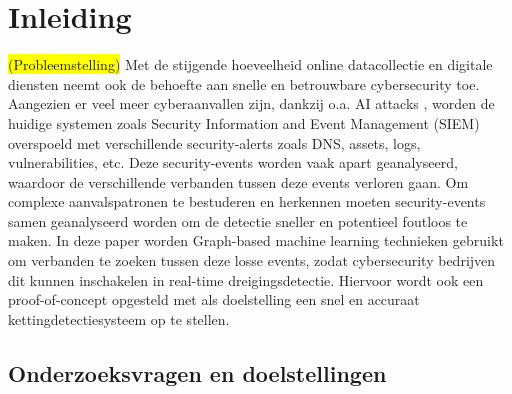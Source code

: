 


% 

\section{Inleiding}%
\label{sec:inleiding}
\colorbox{yellow}{(Probleemstelling)} Met de stijgende hoeveelheid online datacollectie en digitale diensten neemt ook de behoefte aan snelle en betrouwbare cybersecurity toe. Aangezien er veel meer cyberaanvallen zijn, dankzij o.a. AI attacks \autocite{Henderson2024}, worden de huidige systemen zoals Security Information and Event Management (SIEM) overspoeld met verschillende security-alerts zoals DNS, assets, logs, vulnerabilities, etc. 
Deze security-events worden vaak apart geanalyseerd, waardoor de verschillende verbanden tussen deze events verloren gaan. Om complexe aanvalspatronen te bestuderen en herkennen moeten security-events samen geanalyseerd worden om de detectie sneller en potentieel foutloos te maken. 
\newline
\newline
In deze paper worden Graph-based machine \newline learning technieken gebruikt om verbanden te zoeken tussen deze losse events, zodat cybersecurity bedrijven dit kunnen inschakelen in real-time dreigingsdetectie. Hiervoor wordt ook een proof-of-concept opgesteld met als doelstelling een snel en accuraat kettingdetectiesysteem op te stellen.

\subsection{Onderzoeksvragen en \newline doelstellingen}
\label{sec:onderzoeksvragen}

